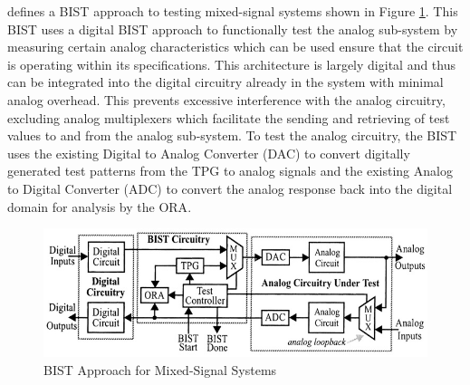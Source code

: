 \documentclass[12pt]{report}
\begin{document}
\cite{stroud} defines a BIST approach to testing mixed-signal systems shown in Figure \ref{fig:mixedbist1}.  This BIST uses a digital BIST approach to functionally test the analog sub-system by measuring certain analog characteristics which can be used ensure that the circuit is operating within its specifications.  This architecture is largely digital and thus can be integrated into the digital circuitry already in the system with minimal analog overhead.  This prevents excessive interference with the analog circuitry, excluding analog multiplexers which facilitate the sending and retrieving of test values to and from the analog sub-system\cite{stroud}.  To test the analog circuitry, the BIST uses the existing Digital to Analog Converter (DAC) to convert digitally generated test patterns from the TPG to analog signals and the existing Analog to Digital Converter (ADC) to convert the analog response back into the digital domain for analysis by the ORA\cite{stroud}.
\begin{figure}
	\begin{center}
		\includegraphics[scale=1.5]{images/mixed-bist-architecture}
	\end{center}
	\caption{BIST Approach for Mixed-Signal Systems\cite{stroud}}
	\label{fig:mixedbist1}
\end{figure}
\end{document}
